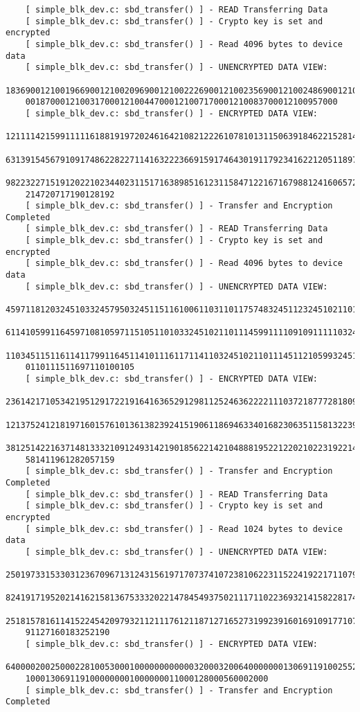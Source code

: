 \documentclass[onecolumn, draftclsnofoot,10pt, compsoc]{IEEEtran}
\begin{document}
\begin{enumerate}
\begin{lstlisting}
    [ simple_blk_dev.c: sbd_transfer() ] - READ Transferring Data
    [ simple_blk_dev.c: sbd_transfer() ] - Crypto key is set and encrypted
    [ simple_blk_dev.c: sbd_transfer() ] - Read 4096 bytes to device data
    [ simple_blk_dev.c: sbd_transfer() ] - UNENCRYPTED DATA VIEW:
    18369001210019669001210020969001210022269001210023569001210024869001210057000121
    001870001210031700012100447000121007170001210083700012100957000
    [ simple_blk_dev.c: sbd_transfer() ] - ENCRYPTED DATA VIEW:
    12111142159911111618819197202461642108212226107810131150639184622152814101176194
    63139154567910917486228227114163222366915917464301911792341622120511897671912431
    98223227151912022102344023115171638985161231158471221671679881241606572412422216
    214720717190128192
    [ simple_blk_dev.c: sbd_transfer() ] - Transfer and Encryption Completed
    [ simple_blk_dev.c: sbd_transfer() ] - READ Transferring Data
    [ simple_blk_dev.c: sbd_transfer() ] - Crypto key is set and encrypted
    [ simple_blk_dev.c: sbd_transfer() ] - Read 4096 bytes to device data
    [ simple_blk_dev.c: sbd_transfer() ] - UNENCRYPTED DATA VIEW:
    45971181203245103324579503245115116100611031101175748324511232451021101114511511
    61141059911645971081059711510511010332451021101114599111109109111110324510211410
    11034511511611411799116451141011161171141103245102110111451121059932451021021141
    0110111511697110100105
    [ simple_blk_dev.c: sbd_transfer() ] - ENCRYPTED DATA VIEW:
    23614217105342195129172219164163652912981125246362222111037218777281809194222082
    12137524121819716015761013613823924151906118694633401682306351158132239502095119
    38125142216371481333210912493142190185622142104888195221220210223192214253105229
    581411961282057159
    [ simple_blk_dev.c: sbd_transfer() ] - Transfer and Encryption Completed
    [ simple_blk_dev.c: sbd_transfer() ] - READ Transferring Data
    [ simple_blk_dev.c: sbd_transfer() ] - Crypto key is set and encrypted
    [ simple_blk_dev.c: sbd_transfer() ] - Read 1024 bytes to device data
    [ simple_blk_dev.c: sbd_transfer() ] - UNENCRYPTED DATA VIEW:
    25019733153303123670967131243156197170737410723810622311522419221711079158017775
    82419171952021416215813675333202214784549375021117110223693214158228174157100641
    25181578161141522454209793211211176121187127165273199239160169109177107841521901
    91127160183252190
    [ simple_blk_dev.c: sbd_transfer() ] - ENCRYPTED DATA VIEW:
    64000020025000228100530001000000000000320003200640000000130691191002552558323910
    1000130691191000000001000000011000128000560002000
    [ simple_blk_dev.c: sbd_transfer() ] - Transfer and Encryption Completed

\end{lstlisting}
\end{enumerate}
\end{document}
